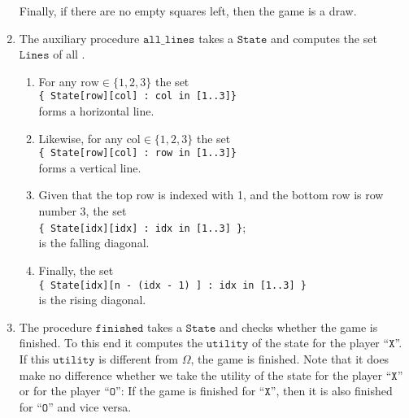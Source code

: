 \begin{enumerate}
      Finally, if there are no empty squares left, then the game is a draw.
\item The auxiliary procedure $\texttt{all\_lines}$ takes a $\texttt{State}$ and computes the set $\texttt{Lines}$ of all
      . 
      \begin{enumerate}
      \item For any $\mathrm{row} \in \{1,2,3\}$ the set 
            \\[0.2cm]
            \hspace*{1.3cm}
            \texttt{\{ State[row][col] : col in [1..3]\}} 
            \\[0.2cm]
            forms a horizontal line. 
      \item Likewise, for any $\mathrm{col} \in \{1,2,3\}$ the set 
            \\[0.2cm]
            \hspace*{1.3cm}
            \texttt{\{ State[row][col] : row in [1..3]\}} 
            \\[0.2cm]
            forms a vertical line. 
      \item Given that the top row is indexed with 1, and the bottom row is row number 3, the set
            \\[0.2cm]
            \hspace*{1.3cm}
            \texttt{\{ State[idx][idx] : idx in [1..3] \}};
            \\[0.2cm]
            is the falling diagonal.
      \item Finally, the set
            \\[0.2cm]
            \hspace*{1.3cm}
            \texttt{\{ State[idx][n - (idx - 1) ] : idx in [1..3] \}}
            \\[0.2cm]
            is the rising diagonal.
      \end{enumerate}
\item The procedure $\texttt{finished}$ takes a $\texttt{State}$ and checks whether the game is finished.
      To this end it computes the $\texttt{utility}$ of the state for the player ``$\texttt{X}$''.  
      If this $\texttt{utility}$ is different from $\Omega$, the game is finished.  Note that it does make no
      difference whether we take the utility of the state for the player ``$\texttt{X}$'' or for the player
      ``$\texttt{O}$'': If the game is finished for  ``$\texttt{X}$'', then it is also finished for ``$\texttt{O}$'' and vice versa.
\end{enumerate}

